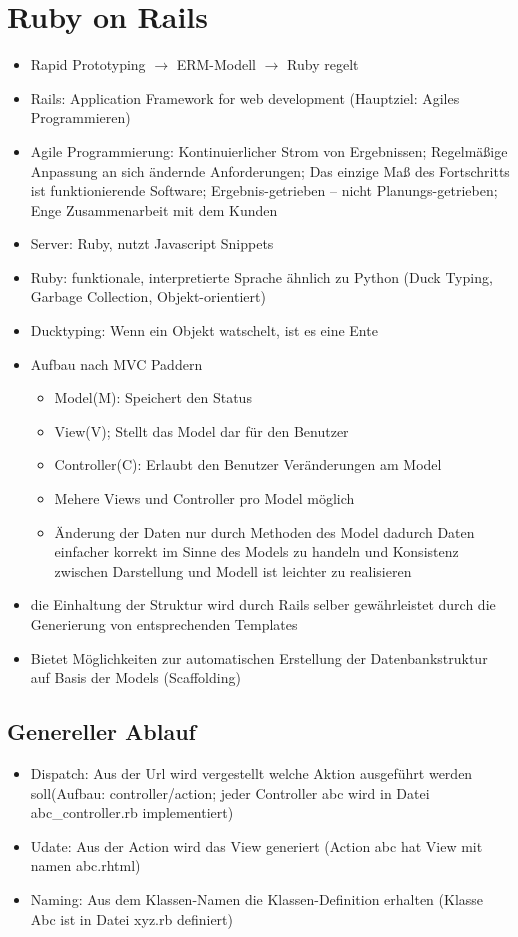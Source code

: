 \documentclass{article} %
\begin{document}
	
\section{Ruby on Rails}
	\begin{itemize}
		\item Rapid Prototyping $\rightarrow$ ERM-Modell $\rightarrow$ Ruby regelt
		\item Rails: Application Framework for web development (Hauptziel: Agiles Programmieren)
		\item Agile Programmierung: Kontinuierlicher Strom von Ergebnissen; Regelmäßige Anpassung an sich ändernde Anforderungen; Das einzige Maß des Fortschritts ist funktionierende Software; Ergebnis-getrieben – nicht Planungs-getrieben; Enge Zusammenarbeit mit dem Kunden
		\item Server: Ruby, nutzt Javascript Snippets
		\item Ruby: funktionale, interpretierte Sprache ähnlich zu Python (Duck Typing, Garbage Collection, Objekt-orientiert)
		\item Ducktyping: Wenn ein Objekt watschelt, ist es eine Ente
		\item Aufbau nach MVC Paddern
		\begin{itemize}
			\item Model(M): Speichert den Status
			\item View(V); Stellt das Model dar für den Benutzer
			\item Controller(C): Erlaubt den Benutzer Veränderungen am Model
			\item Mehere Views und Controller pro Model möglich
			\item Änderung der Daten nur durch Methoden des Model dadurch Daten einfacher korrekt im Sinne des Models zu handeln und  Konsistenz zwischen Darstellung und Modell ist leichter zu realisieren
		\end{itemize}
		\item die Einhaltung der Struktur wird durch Rails selber gewährleistet durch die Generierung von entsprechenden Templates
		\item Bietet Möglichkeiten zur automatischen Erstellung der Datenbankstruktur auf Basis der Models (Scaffolding)
	\end{itemize}
	\subsection{Genereller Ablauf}
	\begin{itemize}
		\item Dispatch: Aus der Url wird vergestellt welche Aktion ausgeführt werden soll(Aufbau: controller/action; jeder Controller abc wird in Datei abc\_controller.rb implementiert)
		\item Udate: Aus der Action wird das View generiert (Action abc hat View mit namen abc.rhtml)
		\item Naming: Aus dem Klassen-Namen die Klassen-Definition erhalten (Klasse Abc ist in Datei xyz.rb definiert)
	\end{itemize}
	
\end{document}
